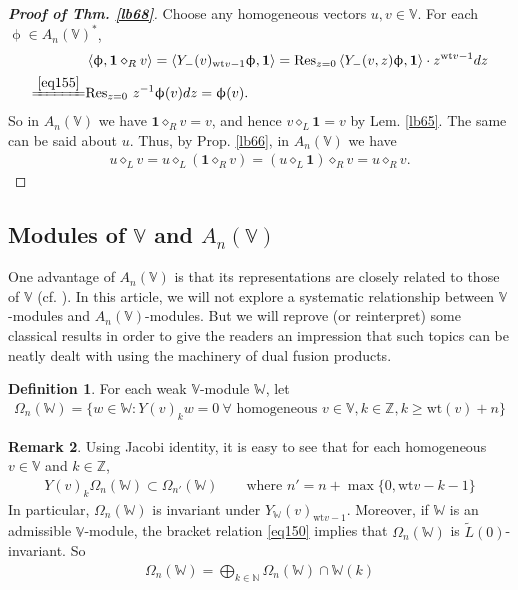 \documentclass[11pt,b5paper,notitlepage]{article}
\theoremstyle{definition}
\newtheorem{df}{Definition}[section]
\newtheorem{rem}[df]{Remark}
\theoremstyle{plain}
\newcommand{\wtd}{\widetilde}
\newcommand{\idt}{\mathbf{1}}
\newcommand{\Res}{\mathrm{Res}}
\newcommand{\Vbb}{\mathbb V}
\newcommand{\Wbb}{\mathbb W}
\newcommand{\Nbb}{\mathbb N}
\newcommand{\Zbb}{\mathbb Z}
\newcommand{\wt}{\mathrm{wt}}
\newcommand{\ibf}{\mathbf 1}
\newcommand{\<}{\left\langle}
\renewcommand{\>}{\right\rangle}
\numberwithin{equation}{section}
\begin{document}
 



     \begin{proof}[\textbf{Proof of Thm. \ref{lb68}}]
Choose any homogeneous vectors $u,v\in \Vbb$. For each $\upphi\in A_n(\Vbb)^*$, 
        \begin{align*}
 & \<\upphi,\idt\diamond_R v\>=             \<Y_-(v)_{\wt v-1}\upphi,\ibf\>=\Res_{z=0}\<Y_-(v,z)\upphi,\ibf\>\cdot z^{\wt v-1}dz\\
\xlongequal{\eqref{eq155}}&\Res_{z=0}~z^{-1}\upphi(v)dz=\upphi(v).
         \end{align*}
So in $A_n(\Vbb)$ we have $\idt\diamond_R v=v$, and hence $v\diamond_L \idt=v$ by Lem. \ref{lb65}. The same can be said about $u$. Thus, by Prop. \ref{lb66}, in $A_n(\Vbb)$ we have
         \begin{align*}
             u\diamond_L v=u\diamond_L (\ibf\diamond_R v)=(u\diamond_L \ibf)\diamond_R v=u\diamond_R v.
         \end{align*}
     \end{proof}



\subsection{Modules of $\Vbb$ and $A_n(\Vbb)$} 


One advantage of $A_n(\Vbb)$ is that its representations are closely related to those of $\Vbb$ (cf. \cite{Zhu-modular-invariance,DLM-Zhu}). In this article, we will not explore a systematic relationship between $\Vbb$-modules and $A_n(\Vbb)$-modules. But we will reprove (or reinterpret) some classical results in order to give the readers an impression that such topics can be neatly dealt with using the machinery of dual fusion products. 


\begin{df}
For each weak $\Vbb$-module $\Wbb$, let
\begin{align*}
\Omega_n(\Wbb)=\{w\in\Wbb: Y(v)_kw=0~\forall \text{ homogeneous }v\in\Vbb,k\in\Zbb,k\geq\wt(v)+n\}
\end{align*}
\end{df}

\begin{rem}
Using Jacobi identity, it is easy to see that for each homogeneous $v\in\Vbb$ and $k\in\Zbb$,
\begin{align}
Y(v)_k\Omega_n(\Wbb)\subset\Omega_{n'}(\Wbb)\qquad\text{where }n'=n+\max\{0,\wt v-k-1\}
\end{align}
In particular, $\Omega_n(\Wbb)$ is invariant under $Y_\Wbb(v)_{\wt v-1}$. Moreover, if $\Wbb$ is an admissible $\Vbb$-module, the bracket relation \eqref{eq150} implies that $\Omega_n(\Wbb)$ is $\wtd L(0)$-invariant. So
\begin{align*}
\Omega_n(\Wbb)=\bigoplus_{k\in\Nbb}\Omega_n(\Wbb)\cap \Wbb(k)
\end{align*}
\end{rem}
\end{document}
